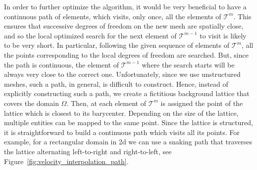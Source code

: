\documentclass[a4paper,12pt,onecolumn]{article}
\begin{document}
In order to further optimize the algorithm, it would be very beneficial to have
a continuous path of elements, which visits, only once, all the elements of
$\mathcal{T}^m$. This ensures that successive degrees of freedom on the new
mesh are spatially close, and so the local optimized search for the next
element of $\mathcal{T}^{m-1}$ to visit is likely to be very short. In
particular, following the given sequence of elements of $\mathcal{T}^m$,
all the points corresponding to the local degrees of freedom are searched.
But, since the path is continuous, the element of $\mathcal{T}^{m-1}$ where the
search starts will be always very close to the correct one. Unfortunately,
since we use unstructured meshes, such a path, in general, is difficult to
construct. Hence, instead of explicitly constructing such a path, we create a
fictitious background lattice that covers the domain $\Omega$. Then, at each
element of $\mathcal{T}^m$ is assigned the point of the lattice which is
closest to its barycenter. Depending on the size of the lattice, multiple
entities can be mapped to the same point. Since the lattice is structured, it
is straightforward to build a continuous path which visits all its points. For
example, for a rectangular domain in 2d we can use a snaking path that
traverses the lattice alternating left-to-right and right-to-left, see
Figure~\ref{fig:velocity_interpolation_path}.
\end{document}
